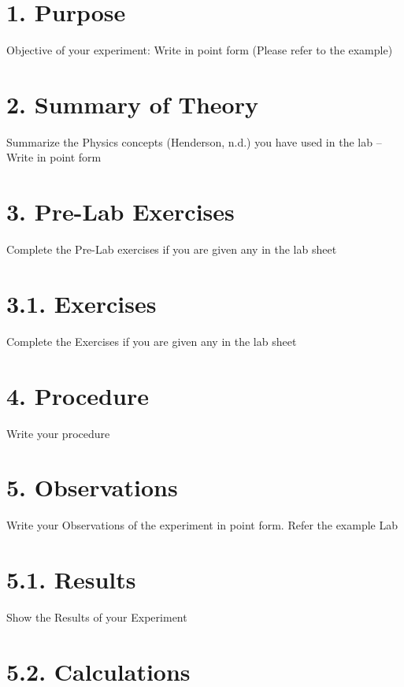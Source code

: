 \documentclass[a4paper,12pt]{article}
\begin{document}
\newpage

\section*{1. Purpose}

Objective of your experiment: Write in point form (Please refer to the example)


\section*{2. Summary of Theory}

Summarize the Physics concepts (Henderson, n.d.) you have used in the lab – Write in point form


\section*{3. Pre-Lab Exercises}

Complete the Pre-Lab exercises if you are given any in the lab sheet


\section*{3.1. Exercises}

Complete the Exercises if you are given any in the lab sheet


\section*{4. Procedure}

Write your procedure


\section*{5. Observations}

Write your Observations of the experiment in point form. Refer the example Lab


\section*{5.1. Results}

Show the Results of your Experiment


\section*{5.2. Calculations}
\end{document}
